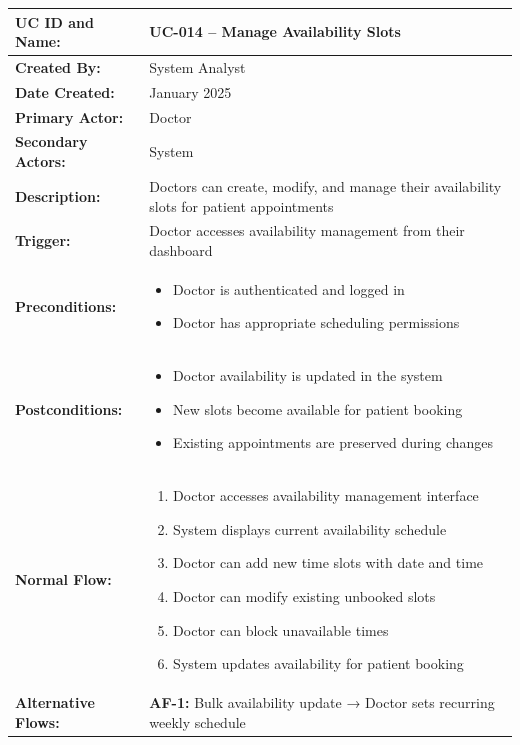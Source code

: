 \documentclass[12pt,a4paper]{article}
\begin{document}
\renewcommand{\arraystretch}{1.5}
\begin{longtable}{|p{4.5cm}|p{10.5cm}|}
\hline
\textbf{UC ID and Name:} & UC-014 – Manage Availability Slots \\
\hline
\textbf{Created By:} & System Analyst \\
\hline
\textbf{Date Created:} & January 2025 \\
\hline
\textbf{Primary Actor:} & Doctor \\
\hline
\textbf{Secondary Actors:} & System \\
\hline
\textbf{Description:} & Doctors can create, modify, and manage their availability slots for patient appointments \\
\hline
\textbf{Trigger:} & Doctor accesses availability management from their dashboard \\
\hline
\textbf{Preconditions:} &
\begin{itemize}
  \item Doctor is authenticated and logged in
  \item Doctor has appropriate scheduling permissions
\end{itemize} \\
\hline
\textbf{Postconditions:} &
\begin{itemize}
  \item Doctor availability is updated in the system
  \item New slots become available for patient booking
  \item Existing appointments are preserved during changes
\end{itemize} \\
\hline
\textbf{Normal Flow:} &
\begin{enumerate}
  \item Doctor accesses availability management interface
  \item System displays current availability schedule
  \item Doctor can add new time slots with date and time
  \item Doctor can modify existing unbooked slots
  \item Doctor can block unavailable times
  \item System updates availability for patient booking
\end{enumerate} \\
\hline
\textbf{Alternative Flows:} &
\textbf{AF-1:} Bulk availability update → Doctor sets recurring weekly schedule \\

\end{longtable}
\end{document}
